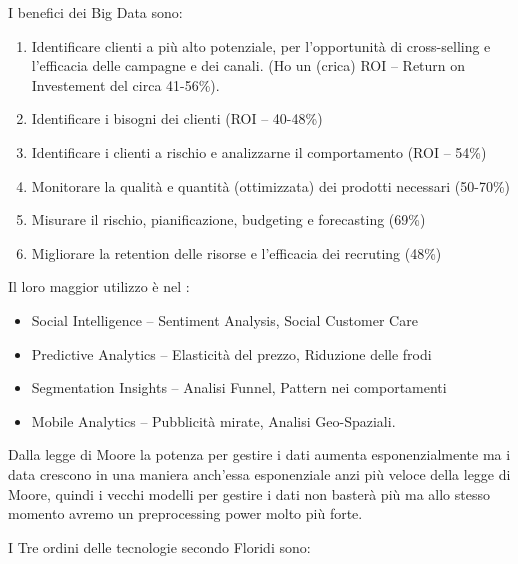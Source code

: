 \documentclass[a4page, 11pt]{article}
\begin{document}
I benefici dei Big Data sono:

\begin{enumerate}
	\def\labelenumi{\arabic{enumi}.}
	 
	\item
	Identificare clienti a più alto potenziale, per l'opportunità di
	cross-selling e l'efficacia delle campagne e dei canali. (Ho un
	(crica) ROI -- Return on Investement del circa 41-56\%).
	\item
	Identificare i bisogni dei clienti (ROI -- 40-48\%)
	\item
	Identificare i clienti a rischio e analizzarne il comportamento (ROI
	-- 54\%)
	\item
	Monitorare la qualità e quantità (ottimizzata) dei prodotti necessari
	(50-70\%)
	\item
	Misurare il rischio, pianificazione, budgeting e forecasting (69\%)
	\item
	Migliorare la retention delle risorse e l'efficacia dei recruting
	(48\%)
\end{enumerate}

Il loro maggior utilizzo è nel :

\begin{itemize}
	 
	\item
	Social Intelligence -- Sentiment Analysis, Social Customer Care
	\item
	Predictive Analytics -- Elasticità del prezzo, Riduzione delle frodi
	\item
	Segmentation Insights -- Analisi Funnel, Pattern nei comportamenti
	\item
	Mobile Analytics -- Pubblicità mirate, Analisi Geo-Spaziali.
\end{itemize}

Dalla legge di Moore la potenza per gestire i dati aumenta
esponenzialmente ma i data crescono in una maniera anch'essa
esponenziale anzi più veloce della legge di Moore, quindi i vecchi
modelli per gestire i dati non basterà più ma allo stesso momento avremo
un preprocessing power molto più forte.

I Tre ordini delle tecnologie secondo Floridi sono:
\end{document}
